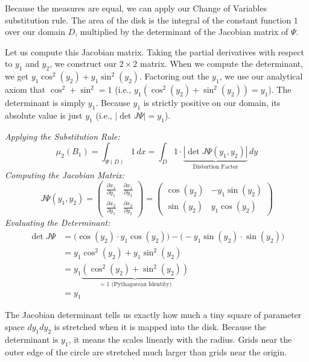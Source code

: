 \begin{spoken-clean}[00:20:17 - 00:22:55]
Because the measures are equal, we can apply our Change of Variables substitution rule. The area of the disk is the integral of the constant function $1$ over our domain $D$, multiplied by the determinant of the Jacobian matrix of $\Psi$. 

Let us compute this Jacobian matrix. Taking the partial derivatives with respect to $y_1$ and $y_2$, we construct our $2 \times 2$ matrix. When we compute the determinant, we get $y_1 \cos^2(y_2) + y_1 \sin^2(y_2)$. Factoring out the $y_1$, we use our analytical axiom that $\cos^2 + \sin^2 = 1$ (i.e., $y_1(\cos^2(y_2) + \sin^2(y_2)) = y_1$). The determinant is simply $y_1$. Because $y_1$ is strictly positive on our domain, its absolute value is just $y_1$ (i.e., $|\det J\Psi| = y_1$).
\end{spoken-clean}


\begin{math-stroke}
\emph{Applying the Substitution Rule:}
\[
\mu_2(B_1) = \int_{\Psi(D)} 1 \, dx = \int_D 1 \cdot \underbrace{|\det J\Psi(y_1, y_2)|}_{\text{Distortion Factor}} \, dy
\]
\emph{Computing the Jacobian Matrix:}
\[
J\Psi(y_1, y_2) = \begin{pmatrix} 
\frac{\partial x_1}{\partial y_1} & \frac{\partial x_1}{\partial y_2} \\[6pt]
\frac{\partial x_2}{\partial y_1} & \frac{\partial x_2}{\partial y_2}
\end{pmatrix} = \begin{pmatrix} 
\cos(y_2) & -y_1 \sin(y_2) \\ 
\sin(y_2) & y_1 \cos(y_2) 
\end{pmatrix}
\]
\emph{Evaluating the Determinant:}
\begin{align*}
\det J\Psi &= \big(\cos(y_2) \cdot y_1 \cos(y_2)\big) - \big(-y_1 \sin(y_2) \cdot \sin(y_2)\big) \\
&= y_1 \cos^2(y_2) + y_1 \sin^2(y_2) \\
&= y_1 \underbrace{(\cos^2(y_2) + \sin^2(y_2))}_{=1 \text{ (Pythagorean Identity)}} \\
&= y_1
\end{align*}

\begin{explanation-of-steps}
The Jacobian determinant tells us exactly how much a tiny square of parameter space $dy_1 dy_2$ is stretched when it is mapped into the disk. Because the determinant is $y_1$, it means the  scales linearly with the radius. Grids near the outer edge of the circle are stretched much larger than grids near the origin.
\end{explanation-of-steps}
\end{math-stroke}

